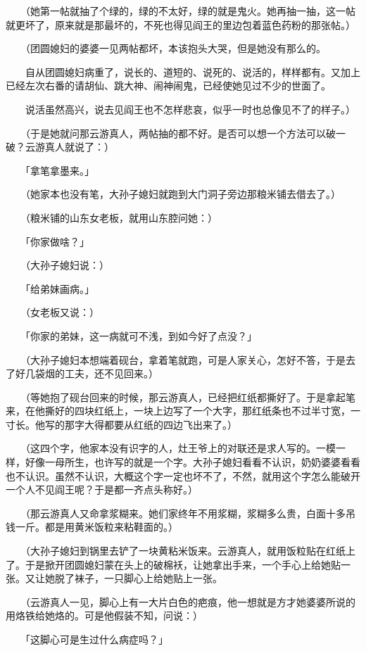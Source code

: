 \documentclass[UTF8]{ctexart}
\begin{document}
　　（她第一帖就抽了个绿的，绿的不太好，绿的就是鬼火。她再抽一抽，这一帖就更坏了，原来就是那最坏的，不死也得见阎王的里边包着蓝色药粉的那张帖。）

　　（团圆媳妇的婆婆一见两帖都坏，本该抱头大哭，但是她没有那么的。

　　自从团圆媳妇病重了，说长的、道短的、说死的、说活的，样样都有。又加上已经左次右番的请胡仙、跳大神、闹神闹鬼，已经使她见过不少的世面了。

　　说活虽然高兴，说去见阎王也不怎样悲哀，似乎一时也总像见不了的样子。）

　　（于是她就问那云游真人，两帖抽的都不好。是否可以想一个方法可以破一破？云游真人就说了：）

　　「拿笔拿墨来。」

　　（她家本也没有笔，大孙子媳妇就跑到大门洞子旁边那粮米铺去借去了。）

　　（粮米铺的山东女老板，就用山东腔问她：）

　　「你家做啥？」

　　（大孙子媳妇说：）

　　「给弟妹画病。」

　　（女老板又说：）

　　「你家的弟妹，这一病就可不浅，到如今好了点没？」

　　（大孙子媳妇本想端着砚台，拿着笔就跑，可是人家关心，怎好不答，于是去了好几袋烟的工夫，还不见回来。）

　　（等她抱了砚台回来的时候，那云游真人，已经把红纸都撕好了。于是拿起笔来，在他撕好的四块红纸上，一块上边写了一个大字，那红纸条也不过半寸宽，一寸长。他写的那字大得都要从红纸的四边飞出来了。）

　　（这四个字，他家本没有识字的人，灶王爷上的对联还是求人写的。一模一样，好像一母所生，也许写的就是一个字。大孙子媳妇看看不认识，奶奶婆婆看看也不认识。虽然不认识，大概这个字一定也坏不了，不然，就用这个字怎么能破开一个人不见阎王呢？于是都一齐点头称好。）

　　（那云游真人又命拿浆糊来。她们家终年不用浆糊，浆糊多么贵，白面十多吊钱一斤。都是用黄米饭粒来粘鞋面的。）

　　（大孙子媳妇到锅里去铲了一块黄粘米饭来。云游真人，就用饭粒贴在红纸上了。于是掀开团圆媳妇蒙在头上的破棉袄，让她拿出手来，一个手心上给她贴一张。又让她脱了袜子，一只脚心上给她贴上一张。

　　（云游真人一见，脚心上有一大片白色的疤痕，他一想就是方才她婆婆所说的用烙铁给她烙的。可是他假装不知，问说：）

　　「这脚心可是生过什么病症吗？」
\end{document}
